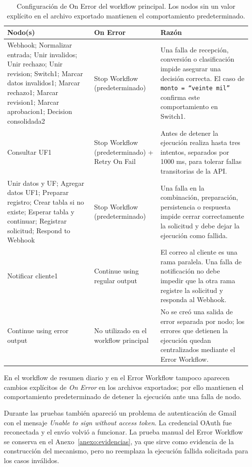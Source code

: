 \documentclass[10pt,a4paper]{article}
\begin{document}
\begin{table}[H]
\centering
\scriptsize
\begin{tabularx}{\textwidth}{p{} p{} X}
\toprule
Nodo(s) & On Error & Razón \\
\midrule
Webhook; Normalizar entrada; Unir invalidos; Unir rechazo; Unir revision; Switch1; Marcar datos invalidos1; Marcar rechazo1; Marcar revision1; Marcar aprobacion1; Decision consolidada2 & Stop Workflow (predeterminado) & Una falla de recepción, conversión o clasificación impide asegurar una decisión correcta. El caso de \texttt{monto = ``veinte mil''} confirma este comportamiento en Switch1. \\
\addlinespace
Consultar UF1 & Stop Workflow (predeterminado) + Retry On Fail & Antes de detener la ejecución realiza hasta tres intentos, separados por 1000 ms, para tolerar fallas transitorias de la API. \\
\addlinespace
Unir datos y UF; Agregar datos UF1; Preparar registro; Crear tabla si no existe; Esperar tabla y continuar; Registrar solicitud; Respond to Webhook & Stop Workflow (predeterminado) & Una falla en la combinación, preparación, persistencia o respuesta impide cerrar correctamente la solicitud y debe dejar la ejecución como fallida. \\
\addlinespace
Notificar cliente1 & Continue using regular output & El correo al cliente es una rama paralela. Una falla de notificación no debe impedir que la otra rama registre la solicitud y responda al Webhook. \\
\addlinespace
Continue using error output & No utilizado en el workflow principal & No se creó una salida de error separada por nodo; los errores que detienen la ejecución quedan centralizados mediante el Error Workflow. \\
\bottomrule
\end{tabularx}
\caption{Configuración de On Error del workflow principal. Los nodos sin un valor explícito en el archivo exportado mantienen el comportamiento predeterminado.}
\label{tab:onerror}
\end{table}

En el workflow de resumen diario y en el Error Workflow tampoco aparecen cambios explícitos de \textit{On Error} en los archivos exportados; por ello mantienen el comportamiento predeterminado de detener la ejecución ante una falla de nodo.

Durante las pruebas también apareció un problema de autenticación de Gmail con el mensaje \textit{Unable to sign without access token}. La credencial OAuth fue reconectada y el envío volvió a funcionar. La prueba manual del Error Workflow se conserva en el Anexo~\ref{anexo:evidencias}, ya que sirve como evidencia de la construcción del mecanismo, pero no reemplaza la ejecución fallida solicitada para los casos inválidos.
\end{document}
